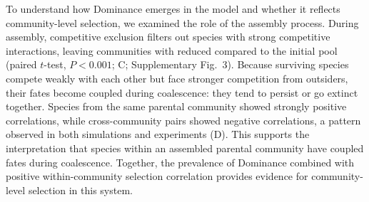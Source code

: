 To understand how Dominance emerges in the model and whether it reflects community-level selection, we examined the role of the assembly process. During assembly, competitive exclusion filters out species with strong competitive interactions, leaving communities with reduced  compared to the initial pool (paired $t$-test, $P <0.001$; C; Supplementary Fig.~3). Because surviving species compete weakly with each other but face stronger competition from outsiders, their fates become coupled during coalescence: they tend to persist or go extinct together.  Species from the same parental community showed strongly positive correlations, while cross-community pairs showed negative correlations, a pattern observed in both simulations and experiments (D). This supports the interpretation that species within an assembled parental community have coupled fates during coalescence. Together, the prevalence of Dominance combined with positive within-community selection correlation provides evidence for community-level selection in this system.


